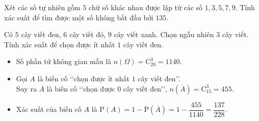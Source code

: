 \begin{vd}
	Xét các số tự nhiên gồm $5$ chữ số khác nhau được lập từ các số $1, 3, 5, 7, 9$. Tính xác suất để tìm được một số không bắt đầu bởi $135$.
\end{vd}
\begin{vd}
	Có $5$ cây viết đen, $6$ cây viết đỏ, $9$ cây viết xanh. Chọn ngẫu nhiên $3$ cây viết. Tính xác suất để chọn được ít nhất $1$ cây viết đen.
	\loigiai
	{
		\begin{itemize}
			\item Số phần tử không gian mẫu là $n(\Omega)=\mathrm{C}_{20}^3=1140$.
			\item Gọi $A$ là biến cố \lq\lq chọn được ít nhất $1$ cây viết đen\rq\rq.\\
			Suy ra $\overline{A}$ là biến cố \lq\lq chọn được $0$ cây viết đen\rq\rq, $n(\overline{A})=\mathrm{C}_{15}^3=455$.
			\item Xác suất của biến cố $A$ là $\mathrm{P}(A)=1-\mathrm{P}(\overline{A})=1-\dfrac{455}{1140}=\dfrac{137}{228}$.
		\end{itemize}
	}
\end{vd}
